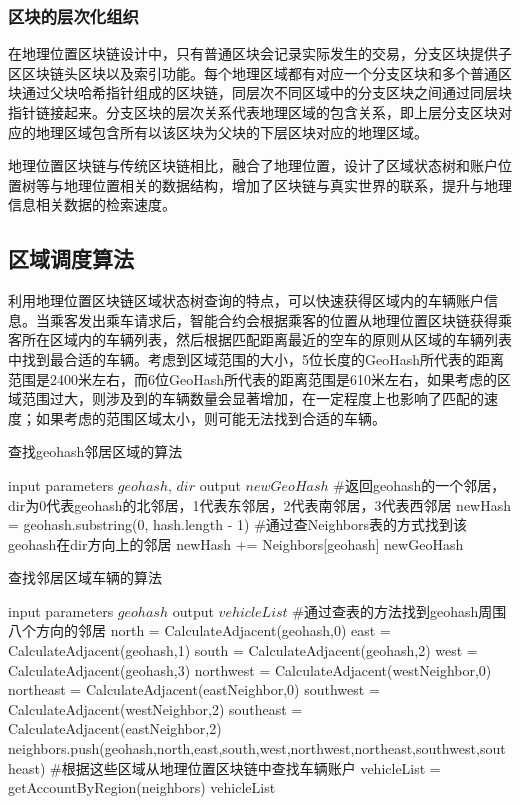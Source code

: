 \subsubsection{区块的层次化组织}
在地理位置区块链设计中，只有普通区块会记录实际发生的交易，分支区块提供子区区块链头区块以及索引功能。每个地理区域都有对应一个分支区块和多个普通区块通过父块哈希指针组成的区块链，同层次不同区域中的分支区块之间通过同层块指针链接起来。分支区块的层次关系代表地理区域的包含关系，即上层分支区块对应的地理区域包含所有以该区块为父块的下层区块对应的地理区域。

地理位置区块链与传统区块链相比，融合了地理位置，设计了区域状态树和账户位置树等与地理位置相关的数据结构，增加了区块链与真实世界的联系，提升与地理信息相关数据的检索速度。

\subsection{区域调度算法}

利用地理位置区块链区域状态树查询的特点，可以快速获得区域内的车辆账户信息。当乘客发出乘车请求后，智能合约会根据乘客的位置从地理位置区块链获得乘客所在区域内的车辆列表，然后根据匹配距离最近的空车的原则从区域的车辆列表中找到最合适的车辆。考虑到区域范围的大小，5位长度的GeoHash所代表的距离范围是2400米左右，而6位GeoHash所代表的距离范围是610米左右，如果考虑的区域范围过大，则涉及到的车辆数量会显著增加，在一定程度上也影响了匹配的速度；如果考虑的范围区域太小，则可能无法找到合适的车辆。

\begin{algorithm}[h]
  \caption{查找geohash邻居区域的算法}
  \label{alg:findNeighbor}
  \begin{algorithmic}[1]
    \REQUIRE input parameters $geohash$, $dir$
    \ENSURE output $newGeoHash$
    \STATE #返回geohash的一个邻居，dir为0代表geohash的北邻居，1代表东邻居，2代表南邻居，3代表西邻居
    \STATE newHash = geohash.substring(0, hash.length - 1)
    \STATE #通过查Neighbors表的方式找到该geohash在dir方向上的邻居
    \STATE newHash += Neighbors[geohash]
    \RETURN newGeoHash
    \end{algorithmic}
\end{algorithm}

\begin{algorithm}[h]
  \caption{查找邻居区域车辆的算法}
  \label{alg:findNeighborVehicles}
  \begin{algorithmic}[1]
  \REQUIRE input parameters $geohash$
  \ENSURE output $vehicleList$
  \STATE #通过查表的方法找到geohash周围八个方向的邻居
  \STATE north = CalculateAdjacent(geohash,0)
  \STATE east = CalculateAdjacent(geohash,1)
  \STATE south = CalculateAdjacent(geohash,2)
  \STATE west = CalculateAdjacent(geohash,3)
  \STATE northwest = CalculateAdjacent(westNeighbor,0)
  \STATE northeast = CalculateAdjacent(eastNeighbor,0)
  \STATE southwest = CalculateAdjacent(westNeighbor,2)
  \STATE southeast = CalculateAdjacent(eastNeighbor,2)
  \STATE neighbors.push(geohash,north,east,south,west,northwest,northeast,southwest,southeast)
  \STATE #根据这些区域从地理位置区块链中查找车辆账户
  \STATE vehicleList = getAccountByRegion(neighbors)
  \RETURN vehicleList
  \end{algorithmic}
\end{algorithm}

